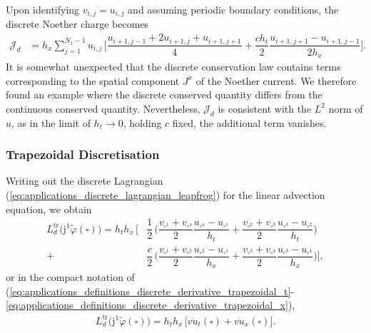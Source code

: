 \documentclass[12pt,a4paper,reqno]{article}
\begin{document}
Upon identifying ${\ensuremath{{\ensuremath{{v}}}}}_{i,j} = {\ensuremath{{\ensuremath{{u}}}}}_{i,j}$ and assuming periodic boundary conditions, the discrete Noether charge becomes
\begin{align}\label{eq:noether_discrete_conservation_law_L2_reduced}
\mathcal{J}_{d} &= h_{x} \sum \limits_{j=1}^{N_{1}-1} u_{i,j} \, \bigg[ \dfrac{u_{i+1,j-1} + 2 u_{i+1,j} + u_{i+1,j+1}}{4} + \dfrac{c h_{t}}{2} \dfrac{ u_{i+1,j+1} - u_{i+1,j-1}}{2 h_{x}} \bigg] .
\end{align}
It is somewhat unexpected that the discrete conservation law contains terms corresponding to the spatial component $J^{\ensuremath{{\ensuremath{{x}}}}}$ of the Noether current.
We therefore found an example where the discrete conserved quantity differs from the continuous conserved quantity.
Nevertheless, $\mathcal{J}_{d}$ is consistent with the $L^{2}$ norm of ${\ensuremath{{\ensuremath{{u}}}}}$, as in the limit of $h_{t} \rightarrow 0$, holding $c$ fixed, the additional term vanishes.

\subsubsection{Trapezoidal Discretisation}
\label{sec:linear_advection_leapfrog}

Writing out the discrete Lagrangian (\ref{eq:applications_discrete_lagrangian_leapfrog}) for the linear advection equation, we obtain
\begin{align}\label{eq:linear_advection_discrete_lagrangian_leapfrog_2}
L_{d}^{\mathrm{tr}} \big( {\ensuremath{\mathrm{j}}}^{1} \tilde{\ensuremath{\varphi}} (\square) \big) = h_{t} h_{x} \, \bigg[ &
\nonumber
\dfrac{1}{2} \, \bigg(
  \dfrac{v_{\square^{1}} + v_{\square^{4}}}{2} \dfrac{u_{\square^{4}} - u_{\square^{1}}}{h_{t}}
+ \dfrac{v_{\square^{2}} + v_{\square^{3}}}{2} \dfrac{u_{\square^{3}} - u_{\square^{2}}}{h_{t}}
\bigg) \\
\nonumber
+ &
\dfrac{c}{2} \, \bigg(
  \dfrac{v_{\square^{1}} + v_{\square^{2}}}{2} \dfrac{u_{\square^{2}} - u_{\square^{1}}}{h_{x}}
+ \dfrac{v_{\square^{3}} + v_{\square^{4}}}{2} \dfrac{u_{\square^{3}} - u_{\square^{4}}}{h_{x}}
\bigg)
\bigg],
\end{align}
or in the compact notation of (\ref{eq:applications_definitions_discrete_derivative_trapezoidal_t}-\ref{eq:applications_definitions_discrete_derivative_trapezoidal_x}),
\begin{align}
L_{d}^{\mathrm{tr}} \big( {\ensuremath{\mathrm{j}}}^{1} \tilde{\ensuremath{\varphi}} (\square) \big) = h_{t} h_{x} \, \big[ \overline{vu}_{t} (\square) + \overline{vu}_{x} (\square)
\big] .
\end{align}
\end{document}
